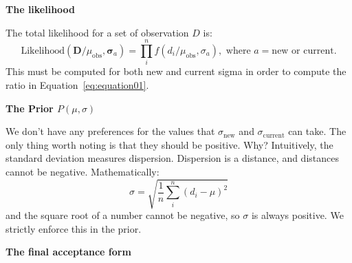 \textbf{The likelihood}

The total likelihood for a set of observation $D$ is:
\begin{equation}\text {Likelihood}\left(\boldsymbol{D} / \mu_{\text {obs}}, \boldsymbol{\sigma}_{a}\right)=\prod_{i}^{n} f\left(d_{i} / \mu_{\text {obs}}, \sigma_{a}\right), \text { where } a=\text {new or current.}\end{equation}
This must be computed for both new and current sigma in order to compute the ratio in Equation~\ref{eq:equation01}.

\textbf{The Prior $P(\mu,\sigma)$}

We don't have any preferences for the values that $\sigma_\textrm{new}$ and $\sigma_\textrm{current}$ can take. The only thing worth noting is that they should be positive. Why? Intuitively, the standard deviation measures dispersion. Dispersion is a distance, and distances cannot be negative.
Mathematically:
\begin{equation}\sigma=\sqrt{\frac{1}{n} \sum_{i}^{n}\left(d_{i}-\mu\right)^{2}}\end{equation}
and the square root of a number cannot be negative, so $\sigma$ is always positive. We strictly enforce this in the prior.

\textbf{The final acceptance form}

